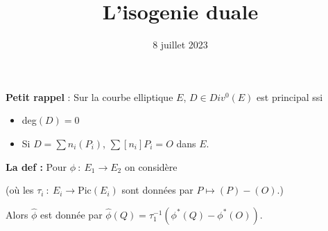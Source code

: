 \documentclass[12pt]{article}
\title{L'isogenie duale}
\date{8 juillet 2023}
\newcommand{\Pic}{\textrm{Pic}}
\begin{document}
\maketitle

\noindent \noindent \textbf{Petit rappel} : Sur la courbe elliptique $E$, $D\in Div^0(E)$ est principal ssi 
\begin{itemize}
    \item deg$(D)=0$
    \item Si $D=\sum n_i(P_i)$, $\sum [n_i]P_i=O$ dans $E$.
\end{itemize}    

\noindent \textbf{\color{wgrey} La def :} Pour $\phi~:~E_1\rightarrow E_2$ on considère \\\begin{center}

(où les $\tau_i~:~E_i\rightarrow \Pic(E_i)$ sont données par $P\mapsto (P)-(O)$.)

\end{center}
Alors $\hat{\phi}$ est donnée par $\hat{\phi}(Q)=\tau_1^{-1}(\phi^*(Q)-\phi^*(O))$.
\end{document}
